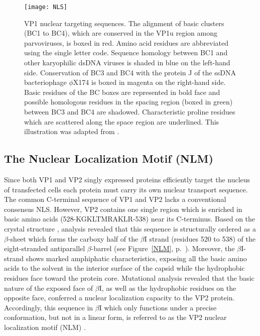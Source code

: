 \begin{figure}
\centering
  \texttt{[image: NLS]}
  \caption[Nuclear localisation signal (NLS)]
   {VP1 nuclear targeting sequences. The alignment of basic clusters (BC1 to BC4), which are conserved in the VP1u region among parvoviruses, is boxed in red. Amino acid residues are abbreviated using the single letter code. Sequence homology between BC1 and other karyophilic dsDNA viruses is shaded in blue on the left-hand side. Conservation of BC3 and BC4 with the protein J of the ssDNA bacteriophage $\phi$X174 is boxed in magenta on the right-hand side. Basic residues of the BC boxes are represented in bold face and possible homologous residues in the spacing region (boxed in green) between BC3 and BC4 are shadowed. Characteristic proline residues which are scattered along the space region are underlined. This illustration was adapted from \cite{pmid12072505, almendral}.}
\label{NLS}
\end{figure}


\subsection{The Nuclear Localization Motif (NLM)}
\label{NLM1}
Since both VP1 and VP2 singly expressed proteins efficiently target the nucleus of transfected cells \cite{pmid8416366, pmid12072505} each protein must carry its own nuclear transport sequence. The common C-terminal sequence of VP1 and VP2 lacks a conventional consensus NLS. However, VP2 contains one single region which is enriched in basic amino acids (528-KGKLTMRAKLR-538) near its C-terminus. Based on the crystal structure \cite{pmid9817841, pmid2006420}, analysis revealed that this sequence is structurally ordered as a $\beta$-sheet which forms the carboxy half of the $\beta$I strand (residues 520 to 538) of the eight-stranded antiparallel $\beta$-barrel (see Figure~\ref{NLM}, p.~\pageref{NLM}). Moreover, the $\beta$I-strand shows marked amphiphatic characteristics, exposing all the basic amino acids to the solvent in the interior surface of the capsid while the hydrophobic residues face toward the protein core. Mutational analysis revealed that the basic nature of the exposed face of $\beta$I, as well as the hydrophobic residues on the opposite face, conferred a nuclear localization capacity to the VP2 protein. Accordingly, this sequence in $\beta$I which only functions under a precise conformation, but not in a linear form, is referred to as the VP2 nuclear localization motif (NLM) \cite{pmid10729155}.        

